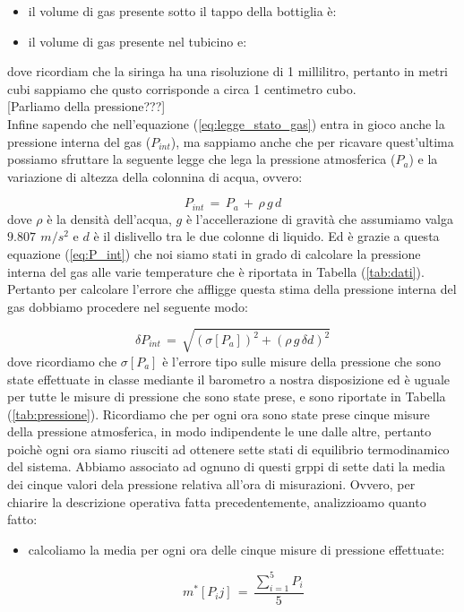 \begin{itemize}
	\item{il volume di gas presente sotto il tappo della bottiglia è: }
	\item{il volume di gas presente nel tubicino e: }
\end{itemize}
%
dove ricordiam che la siringa ha una risoluzione di 1 millilitro, pertanto in metri cubi sappiamo che qusto corrisponde a circa 1 centimetro cubo.\\

[Parliamo della pressione???]\\

Infine sapendo che nell'equazione (\ref{eq:legge_stato_gas}) entra in gioco anche la pressione interna del gas ($P_{int}$), ma sappiamo anche che per ricavare quest'ultima possiamo sfruttare la seguente legge che lega la pressione atmosferica ($P_a$) e la variazione di altezza della colonnina di acqua, ovvero:

\begin{equation}
	P_{int} \,=\, P_a \,+\, \rho \, g \, d
	\label{eq:P_int}
\end{equation}
%
dove $\rho$ è la densità dell'acqua, $g$ è l'accellerazione di gravità che assumiamo valga $\SI{9.807}{\,m/s^2}$ e $d$ è il dislivello tra le due colonne di liquido. Ed è grazie a questa equazione (\ref{eq:P_int}) che noi siamo stati in grado di calcolare la pressione interna del gas alle varie temperature che è riportata in Tabella (\ref{tab:dati}).\\
Pertanto per calcolare l'errore che affligge questa stima della pressione interna del gas dobbiamo procedere nel seguente modo:

\begin{equation*}
	\delta P_{int} \,=\, \sqrt{(\sigma [P_a])^2 + (\rho\,g\,\delta d)^2}
\end{equation*}
%
dove ricordiamo che $\sigma [P_a]$ è l'errore tipo sulle misure della pressione che sono state effettuate in classe mediante il barometro a nostra disposizione ed è uguale per tutte le misure di pressione che sono state prese, e sono riportate in Tabella (\ref{tab:pressione}). Ricordiamo che per ogni ora sono state prese cinque misure della pressione atmosferica, in modo indipendente le une dalle altre, pertanto poichè ogni ora siamo riusciti ad ottenere sette stati di equilibrio termodinamico del sistema. Abbiamo associato ad ognuno di questi grppi di sette dati la media dei cinque valori dela pressione relativa all'ora di misurazioni. Ovvero, per chiarire la descrizione operativa fatta precedentemente, analizzioamo quanto fatto:

\begin{itemize}
	\item{calcoliamo la media per ogni ora delle cinque misure di pressione effettuate:
			
			\begin{equation*}
				m^*[P_ij] \,=\, \frac{\sum_{i=1}^{5} P_i}{5} 
			\end{equation*}}
\end{itemize}










